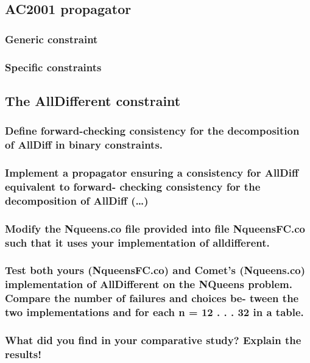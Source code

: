 \documentclass[a4paper ,12pt,french]{article}
\begin{document}
\subsection{AC2001 propagator}
\subsubsection{Generic constraint}
\subsubsection{Specific constraints}

\subsection{The AllDifferent constraint}
\subsubsection{Define forward-checking consistency for the decomposition of AllDiff in binary constraints.}
\subsubsection{Implement a propagator ensuring a consistency for AllDiff equivalent to forward- checking consistency for the decomposition of AllDiff (\dots)}


\subsubsection{Modify the Nqueens.co file provided into file NqueensFC.co such that it uses your implementation of alldifferent.}
\subsubsection{Test both yours (NqueensFC.co) and Comet’s (Nqueens.co) implementation of AllDifferent on the NQueens problem. Compare the number of failures and choices be- tween the two implementations and for each n = 12 . . . 32 in a table.}
\subsubsection{What did you find in your comparative study? Explain the results!}
\end{document}
